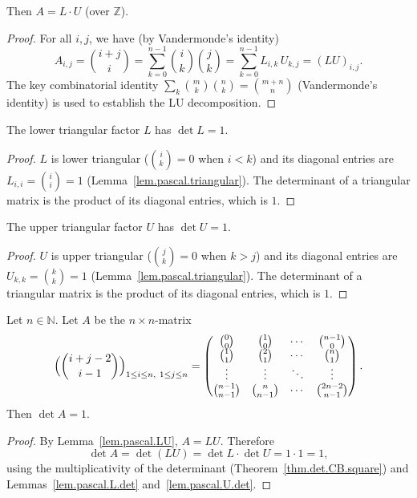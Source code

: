 \begin{lemma}
\label{lem.pascal.LU}
\leanhelper
\leanok
Then $A = L \cdot U$ (over $\mathbb{Z}$).
\end{lemma}

\begin{proof}
\leanok
For all $i,j$, we have (by Vandermonde's identity)
\[
A_{i,j} = \binom{i+j}{i}
= \sum_{k=0}^{n-1} \binom{i}{k} \binom{j}{k}
= \sum_{k=0}^{n-1} L_{i,k}\, U_{k,j}
= (LU)_{i,j}.
\]
The key combinatorial identity
$\sum_{k} \binom{m}{k}\binom{n}{k} = \binom{m+n}{n}$
(Vandermonde's identity) is used to establish the LU decomposition.
\end{proof}

\begin{lemma}
\label{lem.pascal.L.det}
\leanhelper
\leanok
The lower triangular factor $L$ has $\det L = 1$.
\end{lemma}

\begin{proof}
\leanok
$L$ is lower triangular
($\binom{i}{k} = 0$ when $i < k$) and its diagonal entries are
$L_{i,i} = \binom{i}{i} = 1$
(Lemma~\ref{lem.pascal.triangular}).
The determinant of a triangular matrix is the product of its diagonal
entries, which is $1$.
\end{proof}

\begin{lemma}
\label{lem.pascal.U.det}
\leanhelper
\leanok
The upper triangular factor $U$ has $\det U = 1$.
\end{lemma}

\begin{proof}
\leanok
$U$ is upper triangular
($\binom{j}{k} = 0$ when $k > j$) and its diagonal entries are
$U_{k,k} = \binom{k}{k} = 1$
(Lemma~\ref{lem.pascal.triangular}).
The determinant of a triangular matrix is the product of its diagonal
entries, which is $1$.
\end{proof}

\begin{proposition}
\label{prop.det.pascal-LU}
\leantarget
\leanok
Let $n\in\mathbb{N}$. Let $A$ be the $n\times n$-matrix
\[
\Bigl(\binom{i+j-2}{i-1}\Bigr)_{1\le i\le n,\ 1\le j\le n}
= \begin{pmatrix}
\binom{0}{0} & \binom{1}{0} & \cdots & \binom{n-1}{0}\\
\binom{1}{1} & \binom{2}{1} & \cdots & \binom{n}{1}\\
\vdots & \vdots & \ddots & \vdots\\
\binom{n-1}{n-1} & \binom{n}{n-1} & \cdots & \binom{2n-2}{n-1}
\end{pmatrix}.
\]
Then $\det A = 1$.
\end{proposition}

\begin{proof}
By Lemma~\ref{lem.pascal.LU}, $A = LU$. Therefore
\[
\det A = \det(LU) = \det L \cdot \det U = 1 \cdot 1 = 1,
\]
using the multiplicativity of the determinant
(Theorem~\ref{thm.det.CB.square}) and
Lemmas~\ref{lem.pascal.L.det} and~\ref{lem.pascal.U.det}.
\end{proof}
